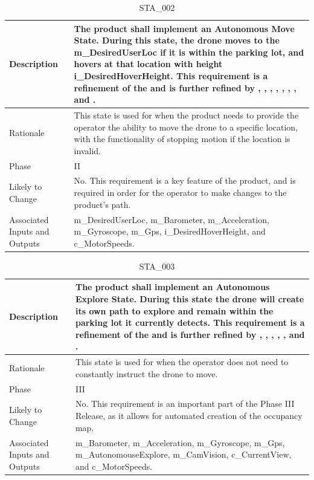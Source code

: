 \documentclass{article}
\begin{document}
\begin{table}[!h]
\begin{center}
\caption {STA\_002} 
\label{STA_002}
\begin{tabular}{ | m{3cm} | m{11cm} | }
\hline
Description & The product shall implement an Autonomous Move State. During this state, the drone moves to the m\_DesiredUserLoc if it is within the parking lot, and hovers at that location with height i\_DesiredHoverHeight. This requirement is a refinement of the \nameref{Autonomous Move State} and is further refined by \nameref{PERF_003}, \nameref{PERF_004}, \nameref{PERF_006}, \nameref{PERF_007}, \nameref{SAFE_001}, \nameref{SAFE_003}, \nameref{USE_003}, and \nameref{PERF_008}. \\
\hline
Rationale & This state is used for when the product needs to provide the operator the ability to move the drone to a specific location, with the functionality of stopping motion if the location is invalid. \\
\hline
Phase & II \\
\hline
Likely to Change & No. This requirement is a key feature of the product, and is required in order for the operator to make changes to the product's path. \\
\hline
Associated Inputs and Outputs & m\_DesiredUserLoc, m\_Barometer, m\_Acceleration, m\_Gyroscope, m\_Gps, i\_DesiredHoverHeight, and c\_MotorSpeeds. \\
\hline
\end{tabular}
\end{center}
\end{table}

\begin{table}[!h]
\begin{center}
\caption {STA\_003} 
\label{STA_003}
\begin{tabular}{ | m{3cm} | m{11cm} | }
\hline
Description & The product shall implement an Autonomous Explore State. During this state the drone will create its own path to explore and remain within the parking lot it currently detects. This requirement is a refinement of the \nameref{Autonomous Explore State} and is further refined by \nameref{PERF_001}, \nameref{PERF_004}, \nameref{PERF_007}, \nameref{SAFE_001}, \nameref{SAFE_003}, and \nameref{USE_003}. \\
\hline
Rationale & This state is used for when the operator does not need to constantly instruct the drone to move. \\
\hline
Phase & III \\
\hline
Likely to Change & No. This requirement is an important part of the Phase III Release, as it allows for automated creation of the occupancy map. \\
\hline
Associated Inputs and Outputs & m\_Barometer, m\_Acceleration, m\_Gyroscope, m\_Gps, m\_AutonomouseExplore, m\_CamVision, c\_CurrentView, and c\_MotorSpeeds. \\
\hline
\end{tabular}
\end{center}
\end{table}
\end{document}
